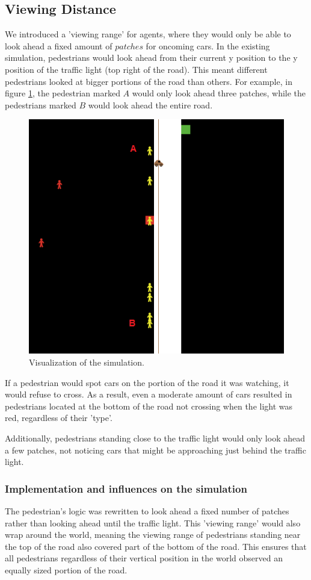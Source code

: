 \documentclass[a4paper]{article}
\begin{document}
\subsection{Viewing Distance}
We introduced a 'viewing range' for agents, where they would only be able to look ahead a fixed amount of $patches$ for oncoming cars. In the existing simulation, pedestrians would look ahead from their current y position to the y position of the traffic light (top right of the road). This meant different pedestrians looked at bigger portions of the road than others. For example, in figure \ref{ABlabel}, the pedestrian marked $A$ would only look ahead three patches, while the pedestrians marked $B$ would look ahead the entire road.

\begin{figure}[H]
\centering
\includegraphics[width=.75\textwidth]{socsim1.png}
\caption{Visualization of the simulation.}
\label{ABlabel}
\end{figure}

If a pedestrian would spot cars on the portion of the road it was watching, it would refuse to cross. As a result, even a moderate amount of cars resulted in pedestrians located at the bottom of the road not crossing when the light was red, regardless of their 'type'.

Additionally, pedestrians standing close to the traffic light would only look ahead a few patches, not noticing cars that might be approaching just behind the traffic light.

\subsubsection{Implementation and influences on the simulation}
The pedestrian's logic was rewritten to look ahead a fixed number of patches rather than looking ahead until the traffic light. This 'viewing range' would also wrap around the world, meaning the viewing range of pedestrians standing near the top of the road also covered part of the bottom of the road. This ensures that all pedestrians regardless of their vertical position in the world observed an equally sized portion of the road.
\end{document}
